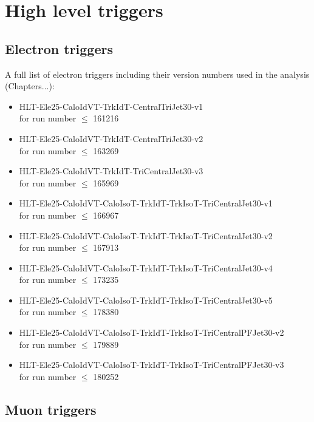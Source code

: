 \chapter{High level triggers}
\label{a:full_trigger_list}
 
\section{Electron triggers}
\label{s:full_trigger_list_electron}
  
A full list of electron triggers including their version numbers used in the \met analysis (Chapters...):
\begin{itemize}
 \item HLT-Ele25-CaloIdVT-TrkIdT-CentralTriJet30-v1 \\for run number $\leq$ 161216
 \item HLT-Ele25-CaloIdVT-TrkIdT-CentralTriJet30-v2 \\for run number $\leq$ 163269
 \item HLT-Ele25-CaloIdVT-TrkIdT-TriCentralJet30-v3 \\for run number $\leq$ 165969
 \item HLT-Ele25-CaloIdVT-CaloIsoT-TrkIdT-TrkIsoT-TriCentralJet30-v1 \\for run number $\leq$ 166967
 \item HLT-Ele25-CaloIdVT-CaloIsoT-TrkIdT-TrkIsoT-TriCentralJet30-v2 \\for run number $\leq$ 167913
 \item HLT-Ele25-CaloIdVT-CaloIsoT-TrkIdT-TrkIsoT-TriCentralJet30-v4 \\for run number $\leq$ 173235
 \item HLT-Ele25-CaloIdVT-CaloIsoT-TrkIdT-TrkIsoT-TriCentralJet30-v5 \\for run number $\leq$ 178380
 \item \small{HLT-Ele25-CaloIdVT-CaloIsoT-TrkIdT-TrkIsoT-TriCentralPFJet30-v2 \\for run number $\leq$ 179889}
 \item HLT-Ele25-CaloIdVT-CaloIsoT-TrkIdT-TrkIsoT-TriCentralPFJet30-v3 \\for run number $\leq$ 180252
\end{itemize}

\section{Muon triggers}
\label{s:full_trigger_list_muon}

